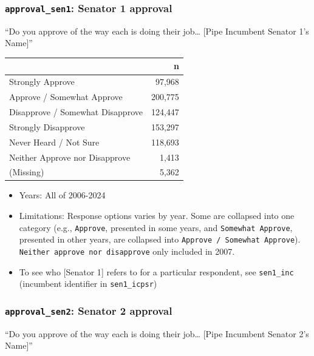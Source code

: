 \documentclass[10pt,article,oneside]{memoir}
\begin{document}
\subsubsection{\texorpdfstring{\texttt{approval\_sen1}: Senator 1
approval}{approval\_sen1: Senator 1 approval}}\label{approval_sen1-senator-1-approval}

``Do you approve of the way each is doing their job\ldots{} {[}Pipe
Incumbent Senator 1's Name{]}''

\begin{table}[H]
\centering
\begin{tabular}[t]{lr}
\toprule
 & n\\
\midrule
Strongly Approve & 97,968\\
Approve / Somewhat Approve & 200,775\\
Disapprove / Somewhat Disapprove & 124,447\\
Strongly Disapprove & 153,297\\
Never Heard / Not Sure & 118,693\\
Neither Approve nor Disapprove & 1,413\\
(Missing) & 5,362\\
\bottomrule
\end{tabular}
\end{table}

\begin{itemize}
\tightlist
\item
  Years: All of 2006-2024
\item
  Limitations: Response options varies by year. Some are collapsed into
  one category (e.g., \texttt{Approve}, presented in some years, and
  \texttt{Somewhat\ Approve}, presented in other years, are collapsed
  into \texttt{Approve\ /\ Somewhat\ Approve}).
  \texttt{Neither\ approve\ nor\ disapprove} only included in 2007.
\item
  To see who {[}Senator 1{]} refers to for a particular respondent, see
  \texttt{sen1\_inc} (incumbent identifier in \texttt{sen1\_icpsr})
\end{itemize}

\subsubsection{\texorpdfstring{\texttt{approval\_sen2}: Senator 2
approval}{approval\_sen2: Senator 2 approval}}\label{approval_sen2-senator-2-approval}

``Do you approve of the way each is doing their job\ldots{} {[}Pipe
Incumbent Senator 2's Name{]}''
\end{document}
